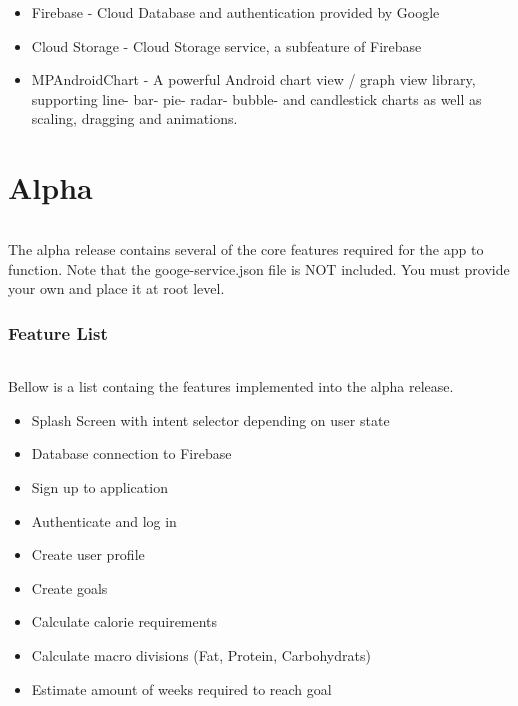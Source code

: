 \documentclass{article}
\begin{document}
        \hfill \break

        \begin{itemize}
            \item Firebase       - Cloud Database and authentication provided by Google
            \item Cloud Storage  - Cloud Storage service, a subfeature of Firebase
            \item MPAndroidChart - A powerful Android chart view / graph view library, supporting line- bar- pie- radar- bubble- and candlestick charts as well as scaling, dragging and animations.
        \end{itemize}
    
    \newpage

    \part{Alpha}
        \paragraph{}
        The alpha release contains several of the core features required for the app to function. Note that the googe-service.json file is NOT included. You must provide your own and place it at root level.

    \hfill \break

    \section{Feature List}
        \paragraph{}
        Bellow is a list containg the features implemented into the alpha release.

        \hfill \break

        \begin{itemize}
            \item Splash Screen with intent selector depending on user state
            \item Database connection to Firebase
            \item Sign up to application
            \item Authenticate and log in
            \item Create user profile
            \item Create goals
            \item Calculate calorie requirements
            \item Calculate macro divisions (Fat, Protein, Carbohydrats)
            \item Estimate amount of weeks required to reach goal
        \end{itemize}
    
\end{document}
